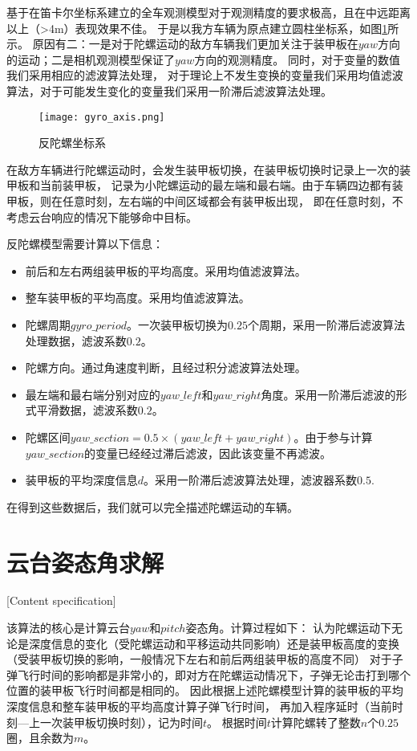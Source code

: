 基于在笛卡尔坐标系建立的全车观测模型对于观测精度的要求极高，且在中远距离以上（>4m）表现效果不佳。
于是以我方车辆为原点建立圆柱坐标系，如图\ref{反陀螺坐标系}所示。
原因有二：一是对于陀螺运动的敌方车辆我们更加关注于装甲板在$yaw$方向的运动；二是相机观测模型保证了$yaw$方向的观测精度。
同时，对于变量的数值我们采用相应的滤波算法处理，
对于理论上不发生变换的变量我们采用均值滤波算法，对于可能发生变化的变量我们采用一阶滞后滤波算法处理。
\begin{figure}[H]
    \centering
    \texttt{[image: gyro\_axis.png]} 
    \caption{反陀螺坐标系} 
    \label{反陀螺坐标系}
\end{figure}



\par
在敌方车辆进行陀螺运动时，会发生装甲板切换，在装甲板切换时记录上一次的装甲板和当前装甲板，
记录为小陀螺运动的最左端和最右端。由于车辆四边都有装甲板，则在任意时刻，左右端的中间区域都会有装甲板出现，
即在任意时刻，不考虑云台响应的情况下能够命中目标。


反陀螺模型需要计算以下信息：
\begin{itemize}[itemindent=2em]
    \item 前后和左右两组装甲板的平均高度。采用均值滤波算法。
    \item 整车装甲板的平均高度。采用均值滤波算法。
    \item 陀螺周期$gyro\_period$。一次装甲板切换为$0.25$个周期，采用一阶滞后滤波算法处理数据，滤波系数$0.2$。
    \item 陀螺方向。通过角速度判断，且经过积分滤波算法处理。
    \item 最左端和最右端分别对应的$yaw\_left$和$yaw\_right$角度。采用一阶滞后滤波的形式平滑数据，滤波系数$0.2$。
    \item 陀螺区间$yaw\_section =0.5 \times (yaw\_left + yaw\_right)$。由于参与计算$yaw\_section$的变量已经经过滞后滤波，因此该变量不再滤波。
    \item 装甲板的平均深度信息$d$。采用一阶滞后滤波算法处理，滤波器系数$0.5$.
\end{itemize}

在得到这些数据后，我们就可以完全描述陀螺运动的车辆。


\section{云台姿态角求解}[Content specification]


该算法的核心是计算云台$yaw$和$pitch$姿态角。计算过程如下：
认为陀螺运动下无论是深度信息的变化（受陀螺运动和平移运动共同影响）还是装甲板高度的变换（受装甲板切换的影响，一般情况下左右和前后两组装甲板的高度不同）
对于子弹飞行时间的影响都是非常小的，即对方在陀螺运动情况下，子弹无论击打到哪个位置的装甲板飞行时间都是相同的。
因此根据上述陀螺模型计算的装甲板的平均深度信息和整车装甲板的平均高度计算子弹飞行时间，
再加入程序延时（当前时刻—上一次装甲板切换时刻），记为时间$t$。
根据时间$t$计算陀螺转了整数$n$个$0.25$圈，且余数为$m$。




